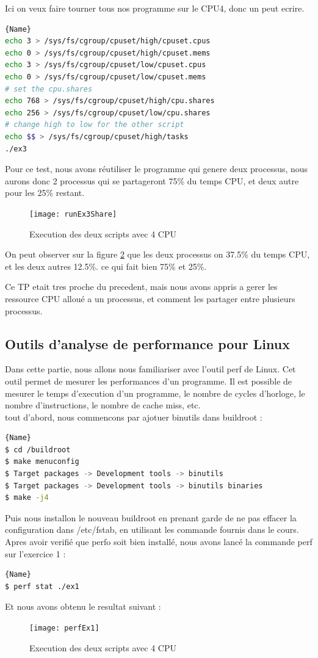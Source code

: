 \documentclass[
	a4paper, %
	10pt, %
]{CSUniSchoolLabReport}
\begin{document}
\begin{enumerate}[label=\textbf{\arabic*}]
Ici on veux faire tourner tous nos programme sur le CPU4, donc un peut ecrire.
\begin{lstlisting}[language=bash, firstnumber=1]{Name}
echo 3 > /sys/fs/cgroup/cpuset/high/cpuset.cpus
echo 0 > /sys/fs/cgroup/cpuset/high/cpuset.mems
echo 3 > /sys/fs/cgroup/cpuset/low/cpuset.cpus
echo 0 > /sys/fs/cgroup/cpuset/low/cpuset.mems
# set the cpu.shares
echo 768 > /sys/fs/cgroup/cpuset/high/cpu.shares
echo 256 > /sys/fs/cgroup/cpuset/low/cpu.shares
# change high to low for the other script
echo $$ > /sys/fs/cgroup/cpuset/high/tasks 
./ex3
\end{lstlisting}
Pour ce test, nous avons réutiliser le programme qui genere deux processus, nous aurons donc 2 processus qui se partageront 75\% du temps CPU, et deux autre pour les 25\% restant.
\begin{figure}[H]
	\centering
	\texttt{[image: runEx3Share]}
	\caption{Execution des deux scripts avec 4 CPU}
	\label{fig:runEx3Share}
\end{figure}
On peut observer sur la figure \ref{fig:runEx3Share} que les deux processus on 37.5\% du temps CPU, et les deux autres 12.5\%.
ce qui fait bien 75\% et 25\%.

Ce TP etait tres proche du precedent, mais nous avons appris a gerer les ressource CPU alloué a un processus, et comment les partager entre plusieurs processus.
\end{enumerate}


\subsection{Outils d'analyse de performance pour Linux}
Dans cette partie, nous allons nous familiariser avec l'outil perf de Linux. Cet outil permet de mesurer les performances d'un programme. Il est possible de mesurer le temps d'execution d'un programme, le nombre de cycles d'horloge, le nombre d'instructions, le nombre de cache miss, etc.\\

tout d'abord, nous commencons par ajotuer binutils dans buildroot :
\begin{lstlisting}[language=bash, firstnumber=1]{Name}
$ cd /buildroot
$ make menuconfig
$ Target packages -> Development tools -> binutils
$ Target packages -> Development tools -> binutils binaries
$ make -j4
\end{lstlisting}

Puis nous installon le nouveau buildroot en prenant garde de ne pas effacer la configuration dans /etc/fstab, en utilisant les commande fournis dans le cours.
Apres avoir verifié que perfo soit bien installé, nous avons lancé la commande perf sur l'exercice 1 :
\begin{lstlisting}[language=bash, firstnumber=1]{Name}
$ perf stat ./ex1
\end{lstlisting}
Et nous avons obtenu le resultat suivant :
\begin{figure}[H]
	\centering
	\texttt{[image: perfEx1]}
	\caption{Execution des deux scripts avec 4 CPU}
	\label{fig:runEx3Share}
\end{figure}
\end{document}
